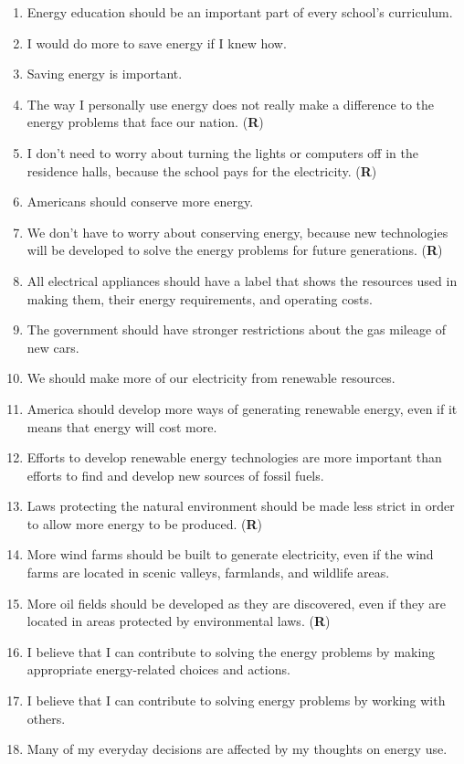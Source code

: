 \begin{enumerate}
	\item Energy education should be an important part of every school's curriculum.
	\item I would do more to save energy if I knew how.
	\item Saving energy is important.
	\item The way I personally use energy does not really make a difference to the energy problems that face our nation. (\textbf{R})
	\item I don't need to worry about turning the lights or computers off in the residence halls, because the school pays for the electricity. (\textbf{R})
	\item Americans should conserve more energy.
	\item We don't have to worry about conserving energy, because new technologies will be developed to solve the energy problems for future generations. (\textbf{R})
	\item All electrical appliances should have a label that shows the resources used in making them, their energy requirements, and operating costs.
	\item The government should have stronger restrictions about the gas mileage of new cars.
	\item We should make more of our electricity from renewable resources.
	\item America should develop more ways of generating renewable energy, even if it means that energy will cost more.
	\item Efforts to develop renewable energy technologies are more important than efforts to find and develop new sources of fossil fuels.
	\item Laws protecting the natural environment should be made less strict in order to allow more energy to be produced. (\textbf{R})
	\item More wind farms should be built to generate electricity, even if the wind farms are located in scenic valleys, farmlands, and wildlife areas.
	\item More oil fields should be developed as they are discovered, even if they are located in areas protected by environmental laws. (\textbf{R})
	\item I believe that I can contribute to solving the energy problems by making appropriate energy-related choices and actions.
	\item I believe that I can contribute to solving energy problems by working with others.
	\item Many of my everyday decisions are affected by my thoughts on energy use.
\end{enumerate}


